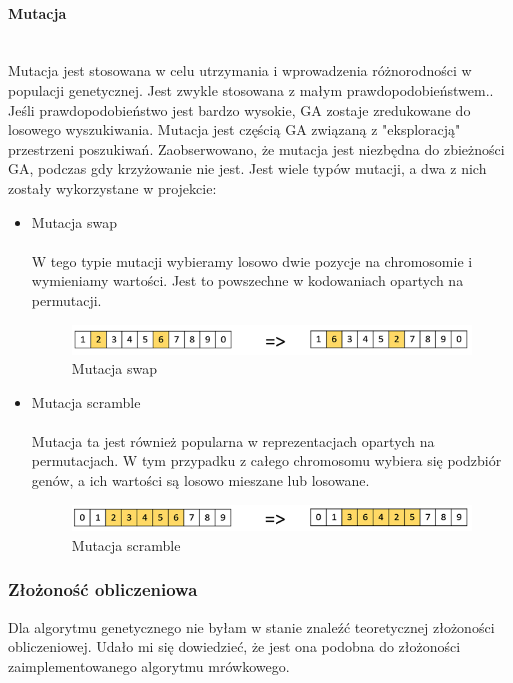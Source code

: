 \documentclass[12pt,a4paper,titlepage]{article}
\begin{document}
\paragraph{Mutacja}\mbox{}\\
Mutacja jest stosowana w celu utrzymania i wprowadzenia różnorodności w populacji genetycznej. Jest zwykle stosowana z małym prawdopodobieństwem.. Jeśli prawdopodobieństwo jest bardzo wysokie, GA zostaje zredukowane do losowego wyszukiwania. Mutacja jest częścią GA związaną z "eksploracją" przestrzeni poszukiwań. Zaobserwowano, że mutacja jest niezbędna do zbieżności GA, podczas gdy krzyżowanie nie jest. Jest wiele typów mutacji, a dwa z nich zostały wykorzystane w projekcie:
\begin{itemize}
    \item Mutacja swap \\\\
    W tego typie mutacji wybieramy losowo dwie pozycje na chromosomie i wymieniamy wartości. Jest to powszechne w kodowaniach opartych na permutacji.
    \begin{figure}[H]
    \centering
    \includegraphics[width = 14cm]{images/swap_mutation.jpg}
    \caption{Mutacja swap \cite{ga_mutation}}
    \label{fig:swap}
    \end{figure}
    \item Mutacja scramble \\\\
    Mutacja ta jest również popularna w reprezentacjach opartych na permutacjach. W tym przypadku z całego chromosomu wybiera się podzbiór genów, a ich wartości są losowo mieszane lub losowane.
    \begin{figure}[H]
    \centering
    \includegraphics[width = 14cm]{images/scramble_mutation.jpg}
    \caption{Mutacja scramble \cite{ga_mutation}}
    \label{fig:scramble}
    \end{figure}
\end{itemize}

\subsubsection{Złożoność obliczeniowa}
Dla algorytmu genetycznego nie byłam w stanie znaleźć teoretycznej złożoności obliczeniowej. Udało mi się dowiedzieć, że jest ona podobna do złożoności zaimplementowanego algorytmu mrówkowego.
\end{document}
